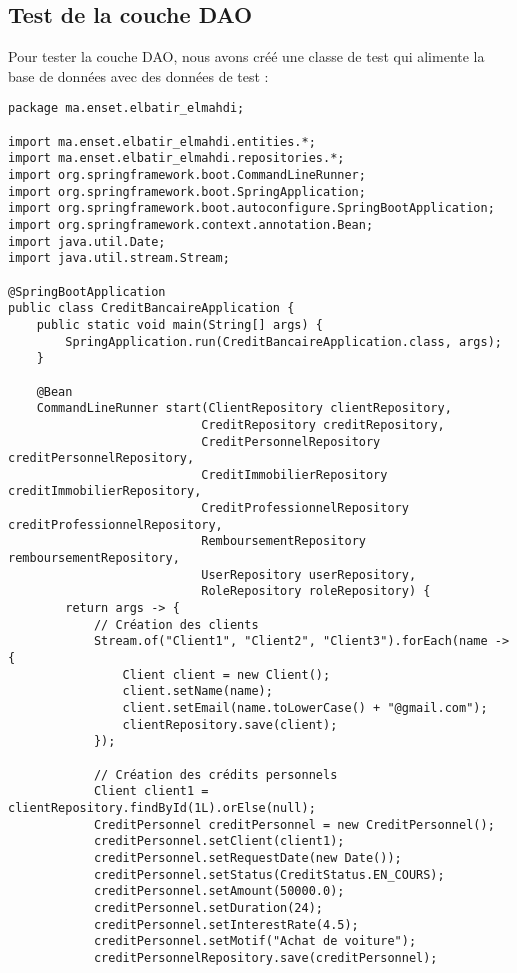 \subsection{Test de la couche DAO}
Pour tester la couche DAO, nous avons créé une classe de test qui alimente la base de données avec des données de test :
\begin{lstlisting}[caption=Application de test de la couche DAO]
package ma.enset.elbatir_elmahdi;

import ma.enset.elbatir_elmahdi.entities.*;
import ma.enset.elbatir_elmahdi.repositories.*;
import org.springframework.boot.CommandLineRunner;
import org.springframework.boot.SpringApplication;
import org.springframework.boot.autoconfigure.SpringBootApplication;
import org.springframework.context.annotation.Bean;
import java.util.Date;
import java.util.stream.Stream;

@SpringBootApplication
public class CreditBancaireApplication {
    public static void main(String[] args) {
        SpringApplication.run(CreditBancaireApplication.class, args);
    }

    @Bean
    CommandLineRunner start(ClientRepository clientRepository,
                           CreditRepository creditRepository,
                           CreditPersonnelRepository creditPersonnelRepository,
                           CreditImmobilierRepository creditImmobilierRepository,
                           CreditProfessionnelRepository creditProfessionnelRepository,
                           RemboursementRepository remboursementRepository,
                           UserRepository userRepository,
                           RoleRepository roleRepository) {
        return args -> {
            // Création des clients
            Stream.of("Client1", "Client2", "Client3").forEach(name -> {
                Client client = new Client();
                client.setName(name);
                client.setEmail(name.toLowerCase() + "@gmail.com");
                clientRepository.save(client);
            });

            // Création des crédits personnels
            Client client1 = clientRepository.findById(1L).orElse(null);
            CreditPersonnel creditPersonnel = new CreditPersonnel();
            creditPersonnel.setClient(client1);
            creditPersonnel.setRequestDate(new Date());
            creditPersonnel.setStatus(CreditStatus.EN_COURS);
            creditPersonnel.setAmount(50000.0);
            creditPersonnel.setDuration(24);
            creditPersonnel.setInterestRate(4.5);
            creditPersonnel.setMotif("Achat de voiture");
            creditPersonnelRepository.save(creditPersonnel);


\end{lstlisting}
